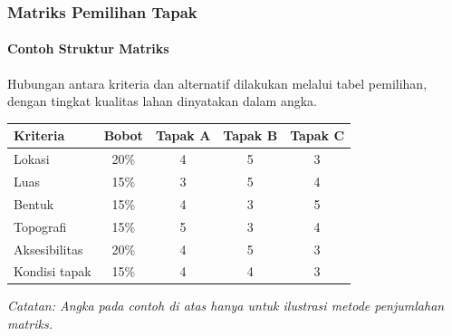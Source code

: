\documentclass[../main.tex]{subfiles}
\begin{document}
\begin{frame}[mytitle=standard, c, mycolor=digiPH_white, light]
	\frametitle{Matriks Pemilihan Tapak}
	\framesubtitle{Contoh Struktur Matriks}

	Hubungan antara kriteria dan alternatif dilakukan melalui tabel pemilihan, dengan tingkat kualitas lahan dinyatakan dalam angka.

	\vspace{0.3cm}
	\begin{table}[]
		\centering
		\small
		\begin{tabular}{@{}lcccc@{}}
			\toprule
			\textbf{Kriteria} & \textbf{Bobot} & \textbf{Tapak A} & \textbf{Tapak B} & \textbf{Tapak C} \\ \midrule
			Lokasi            & 20\%           & 4                & 5                & 3                \\
			Luas              & 15\%           & 3                & 5                & 4                \\
			Bentuk            & 15\%           & 4                & 3                & 5                \\
			Topografi         & 15\%           & 5                & 3                & 4                \\
			Aksesibilitas     & 20\%           & 4                & 5                & 3                \\
			Kondisi tapak     & 15\%           & 4                & 4                & 3                \\ \bottomrule
		\end{tabular}
	\end{table}

	\vspace{0.2cm}
	\footnotesize{\textit{Catatan: Angka pada contoh di atas hanya untuk ilustrasi metode penjumlahan matriks.}}
\end{frame}
\end{document}
